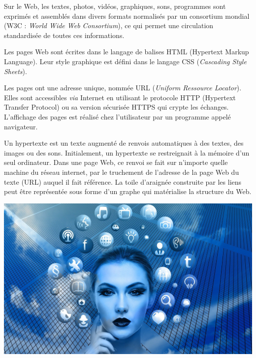 \begin{tcolorbox}[title={Normalisation de la présentation}, toprule=0pt, leftrule=0pt, rightrule=0pt, arc=0pt,
                  fonttitle=\scshape\boxtitlefont,
                  colbacktitle=white, coltitle=firstcolor, colframe=firstcolor, colback=firstcolor!10,
                  breakable, enhanced jigsaw]
Sur le Web, les textes, photos, vidéos, graphiques, sons, programmes sont exprimés et assemblés dans divers formats normalisés par un consortium mondial (W3C : \textit{World Wide Web Consortium}), ce qui permet une circulation standardisée de toutes ces informations.

Les pages Web sont écrites dans le langage de balises HTML (Hypertext Markup Language). Leur style graphique est défini dans le langage CSS (\textit{Cascading Style Sheets}).

Les pages ont une adresse unique, nommée URL (\textit{Uniform Ressource Locator}). Elles sont accessibles \textit{via} Internet en utilisant le protocole HTTP (Hypertext Transfer Protocol) ou sa version sécurisée HTTPS qui crypte les échanges. L’affichage des pages est réalisé chez l’utilisateur par un programme appelé navigateur.

Un hypertexte est un texte augmenté de renvois automatiques à des textes, des images ou des sons. Initialement, un hypertexte se restreignait à la mémoire d’un seul ordinateur. Dans une page Web, ce renvoi se fait sur n’importe quelle machine du réseau internet, par le truchement de l’adresse de la page Web du texte (URL) auquel il fait référence. La toile d’araignée construite par les liens peut être représentée sous forme d’un graphe qui matérialise la structure du Web.
\end{tcolorbox}

\begin{jazzgraphic*}
\includegraphics[width=\linewidth]{./Images/Chapter09/woman-applications-gerd-altmann-pixabay.jpg}%
\end{jazzgraphic*}

